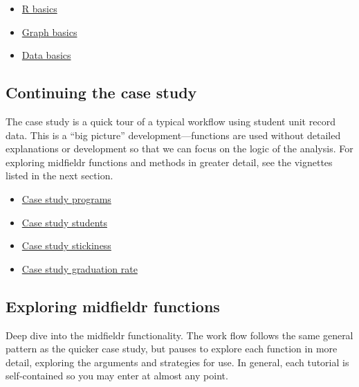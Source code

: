 \documentclass[
]{book}
\providecommand{\tightlist}{%
  \setlength{\itemsep}{0pt}\setlength{\parskip}{0pt}}
\begin{document}
\begin{itemize}
\tightlist
\item
  \protect\hyperlink{r-basics}{R basics}
\item
  \protect\hyperlink{graph-basics}{Graph basics}\\
\item
  \protect\hyperlink{data-basics}{Data basics}
\end{itemize}

\hypertarget{continuing-the-case-study}{%
\subsection{Continuing the case study}\label{continuing-the-case-study}}

The case study is a quick tour of a typical workflow using student unit record data. This is a ``big picture'' development---functions are used without detailed explanations or development so that we can focus on the logic of the analysis. For exploring midfieldr functions and methods in greater detail, see the vignettes listed in the next section.

\begin{itemize}
\tightlist
\item
  \href{https://midfieldr.github.io/midfieldr/articles/art-110-case-study-programs.html}{Case study programs}
\item
  \href{https://midfieldr.github.io/midfieldr/articles/art-120-case-study-students.html}{Case study students}
\item
  \href{https://midfieldr.github.io/midfieldr/articles/art-130-case-study-stickiness.html}{Case study stickiness}
\item
  \href{https://midfieldr.github.io/midfieldr/articles/art-140-case-study-grad-rate.html}{Case study graduation rate}
\end{itemize}

\hypertarget{exploring-midfieldr-functions}{%
\subsection{Exploring midfieldr functions}\label{exploring-midfieldr-functions}}

Deep dive into the midfieldr functionality. The work flow follows the same general pattern as the quicker case study, but pauses to explore each function in more detail, exploring the arguments and strategies for use. In general, each tutorial is self-contained so you may enter at almost any point.
\end{document}
